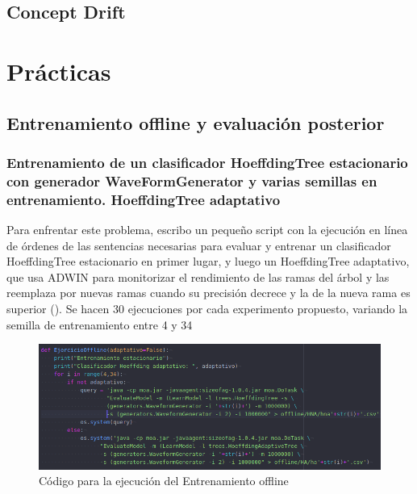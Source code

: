 \subsection{Concept Drift}

\newpage
\section{Prácticas}

\subsection{Entrenamiento offline y evaluación posterior}

\subsubsection{Entrenamiento de un clasificador HoeffdingTree estacionario con generador WaveFormGenerator y varias semillas en entrenamiento. HoeffdingTree adaptativo}

Para enfrentar este problema, escribo un pequeño script con la ejecución en línea de órdenes de las sentencias necesarias para evaluar y entrenar un clasificador HoeffdingTree estacionario en primer lugar, y luego un HoeffdingTree adaptativo, que usa ADWIN para monitorizar el rendimiento de las ramas del árbol y las reemplaza por nuevas ramas cuando su precisión decrece y la de la nueva rama es superior (\cite{HA}). Se hacen 30 ejecuciones por cada experimento propuesto, variando la semilla de entrenamiento entre 4 y 34

\begin{figure}[H] %
	\centering
	\includegraphics[scale=0.5]{off-code.png}  %
	\caption{Código para la ejecución del Entrenamiento offline} 
	\label{fig:off1}
\end{figure}

